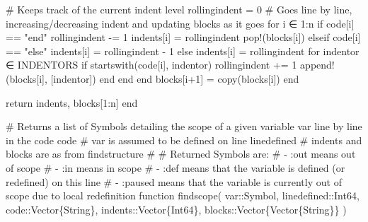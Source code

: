 \documentclass[
  letterpaper,
  DIV=11,
  numbers=noendperiod]{scrreprt}
\newenvironment{Shaded}{\begin{snugshade}}{\end{snugshade}}
\newcommand{\CommentTok}[1]{\textcolor[rgb]{0.37,0.37,0.37}{#1}}
\newcommand{\ControlFlowTok}[1]{\textcolor[rgb]{0.00,0.23,0.31}{#1}}
\newcommand{\DataTypeTok}[1]{\textcolor[rgb]{0.68,0.00,0.00}{#1}}
\newcommand{\FloatTok}[1]{\textcolor[rgb]{0.68,0.00,0.00}{#1}}
\newcommand{\FunctionTok}[1]{\textcolor[rgb]{0.28,0.35,0.67}{#1}}
\newcommand{\KeywordTok}[1]{\textcolor[rgb]{0.00,0.23,0.31}{#1}}
\newcommand{\NormalTok}[1]{\textcolor[rgb]{0.00,0.23,0.31}{#1}}
\newcommand{\OperatorTok}[1]{\textcolor[rgb]{0.37,0.37,0.37}{#1}}
\newcommand{\StringTok}[1]{\textcolor[rgb]{0.13,0.47,0.30}{#1}}
\begin{document}
\begin{Shaded}
\begin{Highlighting}[]
    \CommentTok{\# Keeps track of the current indent level}
\NormalTok{    rollingindent }\OperatorTok{=} \FloatTok{0}
    \CommentTok{\# Goes line by line, increasing/decreasing indent and updating blocks as it goes}
    \ControlFlowTok{for}\NormalTok{ i }\OperatorTok{∈} \FloatTok{1}\OperatorTok{:}\NormalTok{n}
        \ControlFlowTok{if}\NormalTok{ code[i] }\OperatorTok{==} \StringTok{"end"}
\NormalTok{            rollingindent }\OperatorTok{{-}=} \FloatTok{1}
\NormalTok{            indents[i] }\OperatorTok{=}\NormalTok{ rollingindent}
            \FunctionTok{pop!}\NormalTok{(blocks[i])}
        \ControlFlowTok{elseif}\NormalTok{ code[i] }\OperatorTok{==} \StringTok{"else"}
\NormalTok{            indents[i] }\OperatorTok{=}\NormalTok{ rollingindent }\OperatorTok{{-}} \FloatTok{1}
        \ControlFlowTok{else}
\NormalTok{            indents[i] }\OperatorTok{=}\NormalTok{ rollingindent}
            \ControlFlowTok{for}\NormalTok{ indentor }\OperatorTok{∈}\NormalTok{ INDENTORS}
                \ControlFlowTok{if} \FunctionTok{startswith}\NormalTok{(code[i], indentor)}
\NormalTok{                    rollingindent }\OperatorTok{+=} \FloatTok{1}
                    \FunctionTok{append!}\NormalTok{(blocks[i], [indentor])}
                \ControlFlowTok{end}
            \ControlFlowTok{end}
        \ControlFlowTok{end}
\NormalTok{        blocks[i}\OperatorTok{+}\FloatTok{1}\NormalTok{] }\OperatorTok{=} \FunctionTok{copy}\NormalTok{(blocks[i])}
    \ControlFlowTok{end}

    \ControlFlowTok{return}\NormalTok{ indents, blocks[}\FloatTok{1}\OperatorTok{:}\NormalTok{n]}
\KeywordTok{end}

\CommentTok{\# Returns a list of \textasciigrave{}Symbol\textasciigrave{}s detailing the scope of a given variable \textasciigrave{}var\textasciigrave{} line by line in the code \textasciigrave{}code\textasciigrave{}}
\CommentTok{\# \textasciigrave{}var\textasciigrave{} is assumed to be defined on line \textasciigrave{}linedefined\textasciigrave{}}
\CommentTok{\# \textasciigrave{}indents\textasciigrave{} and \textasciigrave{}blocks\textasciigrave{} are as from \textasciigrave{}findstructure\textasciigrave{}}
\CommentTok{\#}
\CommentTok{\# Returned \textasciigrave{}Symbol\textasciigrave{}s are:}
\CommentTok{\# {-} :out means out of scope}
\CommentTok{\# {-} :in means in scope}
\CommentTok{\# {-} :def means that the variable is defined (or redefined) on this line}
\CommentTok{\# {-} :paused means that the variable is currently out of scope due to local redefinition}
\KeywordTok{function} \FunctionTok{findscope}\NormalTok{(}
\NormalTok{    var}\OperatorTok{::}\DataTypeTok{Symbol}\NormalTok{,}
\NormalTok{    linedefined}\OperatorTok{::}\DataTypeTok{Int64}\NormalTok{,}
\NormalTok{    code}\OperatorTok{::}\DataTypeTok{Vector\{String\}}\NormalTok{,}
\NormalTok{    indents}\OperatorTok{::}\DataTypeTok{Vector\{Int64\}}\NormalTok{,}
\NormalTok{    blocks}\OperatorTok{::}\DataTypeTok{Vector\{Vector\{String\}\}}
\NormalTok{)}


\end{Highlighting}
\end{Shaded}
\end{document}
